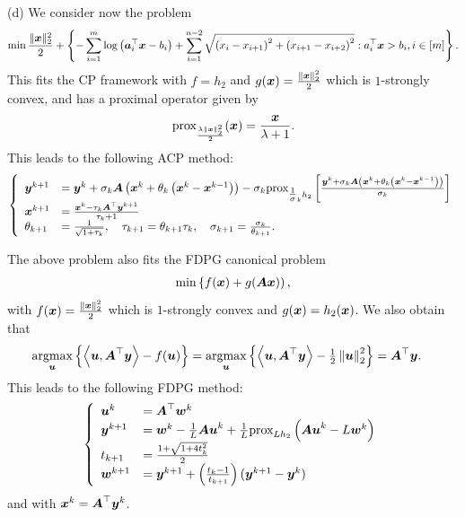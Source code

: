\indent (d) We consider now the problem
\begin{align*}
	\min \frac{\|\boldsymbol x \|^2_2}{2} + \left\{-\sum_{i=1}^m\log\left(\boldsymbol a_i^\top \boldsymbol x - b_i\right)+ \sum_{i=1}^{n-2} \sqrt{\left(x_i-x_{i+1}\right)^2+\left(x_{i+1}-x_{i+2}\right)^2}: a_i^\top \boldsymbol x > b_i, i\in [m] \right\}. 
\end{align*}
This fits the CP framework with $f = h_2$ and $g(\boldsymbol x)=\frac{\|\boldsymbol x \|^2_2}{2}$ which is $1$-strongly convex, and has a proximal operator given by
\begin{align*}
	\text{prox}_{\frac{\lambda\|\boldsymbol x \|^2_2}{2}}(\boldsymbol x) = \frac{\boldsymbol x}{\lambda+1}. 
\end{align*}
This leads to the following ACP method: 
  \begin{align*}
    \begin{split}
    \left\{
    \begin{array}{ll}
       \boldsymbol y^{k+1} &= \boldsymbol y^k + \sigma_k \boldsymbol A\left(\boldsymbol x^k + \theta_k \left( \boldsymbol x^{k}-\boldsymbol x^{k-1}\right)\right)- \sigma_k \text{prox}_{{\textstyle\frac{1}{\sigma}}_k h_2}\left[\frac{\boldsymbol y^k + \sigma_k \boldsymbol A\left(\boldsymbol x^k + \theta_k \left( \boldsymbol x^{k}-\boldsymbol x^{k-1}\right)\right)}{\sigma_k} \right]\\
       \boldsymbol x^{k+1} &= \frac{\boldsymbol x^k - \tau_k\boldsymbol A^\top \boldsymbol y^{k+1}}{\tau_k+1}\\
       \theta_{k+1} &= \frac{1}{\sqrt{1+\tau_k}},\quad \tau_{k+1} = \theta_{k+1}\tau_k,\quad \sigma_{k+1} = \frac{\sigma_k}{\theta_{k+1}}.
    \end{array}
    \right.
    \end{split}
    \end{align*}
    
 The above problem also fits the FDPG canonical problem 
 \begin{align*}
 	\min \left\{ f(\boldsymbol x) + g(\boldsymbol{Ax})\right),
 \end{align*}
 with $f(\boldsymbol x)=\frac{\|\boldsymbol x \|^2_2}{2}$ which is $1$-strongly convex and $g(\boldsymbol x)=h_2(\boldsymbol x)$. We also obtain that
 \begin{align*}
	\underset{\boldsymbol u}{\text{argmax}} \left\{\left \langle \boldsymbol u, \boldsymbol A^\top \boldsymbol y \right \rangle - f(\boldsymbol u)\right\} &= \underset{\boldsymbol u}{\text{argmax}} \left\{\left \langle \boldsymbol u, \boldsymbol A^\top \boldsymbol y \right \rangle - {\textstyle\frac{1}{2}}\left\lVert\boldsymbol u\right\rVert_{2}^2 \right\} = \boldsymbol A^\top \boldsymbol y. 
\end{align*}
This leads to the following FDPG method:
     \begin{align*}
    \begin{split}
    \left\{
    \begin{array}{ll}
         \boldsymbol u^{k} &= \boldsymbol A^\top \boldsymbol w^k\\
        \boldsymbol y^{k+1} &= \boldsymbol w^k-{\textstyle\frac{1}{L}} \boldsymbol{Au}^k + {\textstyle\frac{1}{L}} \text{prox}_{Lh_2}\left(\boldsymbol{Au}^k-L\boldsymbol w^k\right) \\
        t_{k+1} &= \frac{1+\sqrt{1+4t_k^2}}{2} \\
        \boldsymbol w^{k+1} &= \boldsymbol y^{k+1} + \left( 
        \frac{t_k-1}{t_{k+1}} \right) (\boldsymbol y^{k+1}- \boldsymbol y^k)
    \end{array}
    \right.
    \end{split}
    \end{align*}
    and with  $\boldsymbol x^k = \boldsymbol A^\top \boldsymbol y^k$.
    
